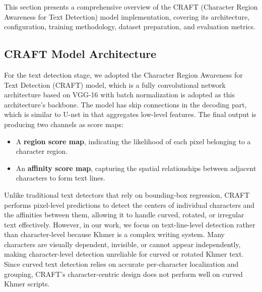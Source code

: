 This section presents a comprehensive overview of the CRAFT 
(Character Region Awareness for Text Detection) model implementation, 
covering its architecture, configuration, training methodology, dataset 
preparation, and evaluation metrics.

\subsection{CRAFT Model Architecture}
\label{subsec:craft-architecture}

For the text detection stage, we adopted the Character Region Awareness for Text 
Detection (CRAFT) model, which is a fully convolutional network architecture 
based on VGG-16 with batch normalization is adopted as this architecture's backbone.
The model has skip connections in the decoding part, which is similar to U-net in
that aggregates low-level features. The final output is producing two channels as 
score maps:
\begin{itemize}
\item A \textbf{region score map}, indicating the likelihood of each pixel belonging 
to a character region.
\item An \textbf{affinity score map}, capturing the spatial relationships between 
adjacent characters to form text lines.
\end{itemize}

Unlike traditional text detectors that rely on bounding-box regression, 
CRAFT performs pixel-level predictions to detect the centers of individual 
characters and the affinities between them, allowing it to handle curved, 
rotated, or irregular text effectively. However, in our work, we focus on 
text-line-level detection rather than character-level because Khmer is a 
complex writing system. Many characters are visually dependent, invisible, 
or cannot appear independently, making character-level detection unreliable 
for curved or rotated Khmer text. Since curved text detection relies on accurate 
per-character localization and grouping, CRAFT's character-centric design does 
not perform well on curved Khmer scripts.



